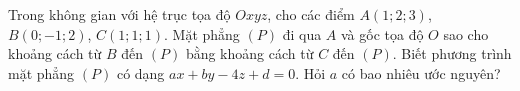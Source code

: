 \begin{ex}%
	Trong không gian với hệ trục tọa độ $O x y z$, cho các điểm $A(1 ; 2 ; 3)$, $B(0 ;-1 ; 2)$, $C(1 ; 1 ; 1)$. Mặt phẳng $(P)$ đi qua $A$ và gốc tọa độ $O$ sao cho khoảng cách từ $B$ đến $(P)$ bằng khoảng cách từ $C$ đến $(P)$. Biết phương trình mặt phẳng $(P)$ có dạng $ax+by-4z+d=0$. Hỏi $a$ có bao nhiêu ước nguyên?
\end{ex}

